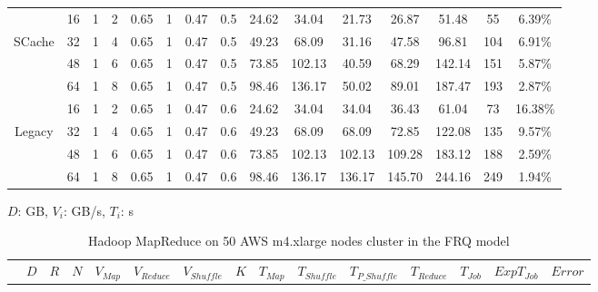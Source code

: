 {\begin{table}[!t]
\begin{tabular}{|c||c|c|c|c|c|c|c||c|c|c|c|c|c|c|}
\hline
 & 16	& 1	& 2 &	0.65 &	1 &	0.47 &	0.5 &	24.62 &		34.04	 &	21.73 &	26.87 &	51.48	& 55  &		6.39\% \\
 SCache
 & 32	& 1	& 4 &	0.65 &	1 &	0.47 &	0.5 &	49.23 &		68.09	 &	31.16 &	47.58 &	96.81	& 104 & 	6.91\% \\
 & 48	& 1	& 6 &	0.65 &	1 &	0.47 &	0.5 &	73.85 &		102.13 &	40.59 &	68.29 &	142.14	& 151 & 	5.87\% \\
 & 64	& 1	& 8 &	0.65 &	1 &	0.47 &	0.5 &	98.46 &		136.17 &	50.02 &	89.01 &	187.47	& 193 & 	2.87\% \\
 \hline
 & 16	& 1 & 2 &	0.65 &	1 &	0.47 &	0.6 &	24.62 &		34.04	&	34.04	&	36.43	&	61.04	&	73	&	16.38\%	\\
 Legacy
 & 32	& 1 & 4 &	0.65 &	1 &	0.47 &	0.6 &	49.23 &		68.09	&	68.09	&	72.85	&	122.08	&	135	&	9.57\%	\\
 & 48	& 1 & 6 &	0.65 &	1 &	0.47 &	0.6 &	73.85 &		102.13	&	102.13	&	109.28	&	183.12	&	188	&	2.59\%	\\
 & 64	& 1 & 8 &	0.65 &	1 &	0.47 &	0.6 &	98.46 &		136.17	&	136.17	&	145.70	&	244.16	&	249	&	1.94\%	\\
\hline
\end{tabular}
\end{table}

\begin{table}[!t]

\renewcommand{\arraystretch}{1.3}
\caption{\color{blue}Hadoop MapReduce on 50 AWS m4.xlarge nodes cluster in the FRQ model}
\label{table2}
\centering
\(D\): GB, \(V_{i}\): GB/s, \(T_{i}\): s
\begin{tabular}{|c||c|c|c|c|c|c|c||c|c|c|c|c|c|c|}
\hline
 &
\(D\) &	
\(R\) &	
\(N\) &	
\(V_{Map}\) &	
\(V_{Reduce}\) &	
\(V_{Shuffle}\) &	
\(K\) &	
\(T_{Map}\) &	
\(T_{Shuffle}\) &	
\(T_{P\_Shuffle}\) &
\(T_{Reduce}\) & 
\(T_{Job}\) & 
\(Exp T_{Job}\) &
\(Error\)\\


\end{tabular}
\end{table}}
